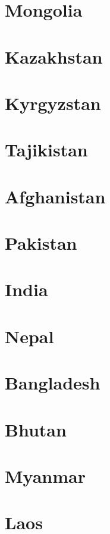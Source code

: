 \documentclass[conference]{IEEEtran}
\begin{document}
	\section{Mongolia}
	
	\section{Kazakhstan}
	
	\section{Kyrgyzstan}
	
	\section{Tajikistan}
	
	\section{Afghanistan}
	
	\section{Pakistan}
	
	\section{India}
	
	\section{Nepal}
	
	\section{Bangladesh}
	
	\section{Bhutan}
	
	\section{Myanmar}
	
	\section{Laos}
	
\end{document}
